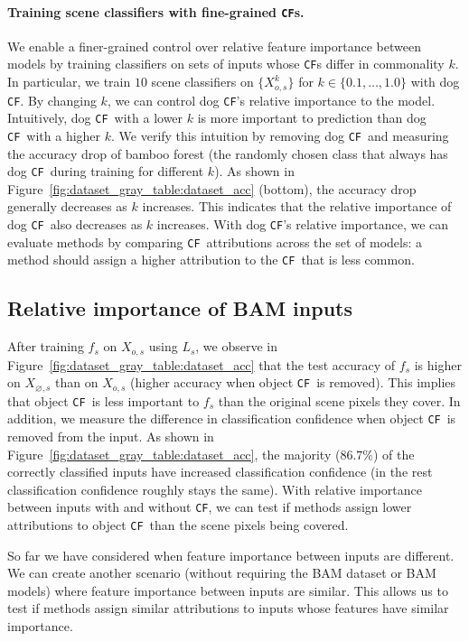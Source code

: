 \documentclass[twoside]{article}
\newcommand{\CF}{\texttt{CF}}
\begin{document}
\paragraph{Training scene classifiers with fine-grained \CF s.}
We enable a finer-grained control over relative feature importance between models by training classifiers on sets of inputs whose \CF s differ in commonality $k$. In particular, we train $10$ scene classifiers on $\{X_{o,s}^{k}\}$ for $k \in \{0.1, \dots, 1.0\}$ with dog \CF. By changing $k$, we can control dog \CF 's relative importance to the model. Intuitively, dog \CF~with a lower $k$ is more important to prediction than dog \CF~with a higher $k$. We verify this intuition by removing dog \CF~and measuring the accuracy drop of bamboo forest (the randomly chosen class that always has dog \CF~during training for different $k$). As shown in Figure~\ref{fig:dataset_gray_table:dataset_acc} (bottom), the accuracy drop generally decreases as $k$ increases. This indicates that the relative importance of dog \CF~also decreases as $k$ increases. With dog \CF 's relative importance, we can evaluate methods by comparing \CF~attributions across the set of models: a method should assign a higher attribution to the \CF~that is less common.

\subsection{Relative importance of BAM inputs}
\label{sec:relative_feature_importance_inputs}
After training $f_s$ on $X_{o,s}$ using $L_s$, we observe in Figure~\ref{fig:dataset_gray_table:dataset_acc} that the test accuracy of $f_s$ is higher on $X_{\varnothing, s}$ than on $X_{o,s}$ (higher accuracy when object \CF~is removed). This implies that object \CF~is less important to $f_s$ than the original scene pixels they cover. In addition, we measure the difference in classification confidence when object \CF~is removed from the input. As shown in Figure~\ref{fig:dataset_gray_table:dataset_acc}, the majority ($86.7\%$) of the correctly classified inputs have increased classification confidence (in the rest classification confidence roughly stays the same). With relative importance between inputs with and without \CF, we can test if methods assign lower attributions to object \CF~than the scene pixels being covered.

 So far we have considered when feature importance between inputs are different. We can create another scenario (without requiring the BAM dataset or BAM models) where feature importance between inputs are similar. This allows us to test if methods assign similar attributions to inputs whose features have similar importance.
 
\end{document}
